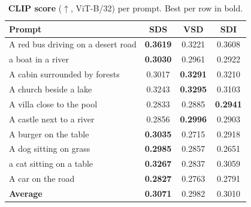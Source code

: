 \begin{table}[t]
  \centering
  \footnotesize
  \caption{\textbf{CLIP score} ($\uparrow$, ViT-B/32) per prompt. Best per row in bold.}
  \label{tab:clip}
  \begin{tabular}{@{}lccc@{}}
    \toprule
    Prompt & SDS & VSD & SDI \\
    \midrule
    A red bus driving on a desert road & \textbf{0.3619} & 0.3221 & 0.3608 \\
    a boat in a river                  & \textbf{0.3030} & 0.2961 & 0.2922 \\
    A cabin surrounded by forests      & 0.3017 & \textbf{0.3291} & 0.3210 \\
    A church beside a lake             & 0.3243 & \textbf{0.3295} & 0.3103 \\
    A villa close to the pool          & 0.2833 & 0.2885 & \textbf{0.2941} \\
    A castle next to a river           & 0.2856 & \textbf{0.2996} & 0.2903 \\
    A burger on the table              & \textbf{0.3035} & 0.2715 & 0.2918 \\
    A dog sitting on grass             & \textbf{0.2985} & 0.2857 & 0.2651 \\
    a cat sitting on a table           & \textbf{0.3267} & 0.2837 & 0.3059 \\
    A car on the road                  & \textbf{0.2827} & 0.2763 & 0.2791 \\
    \midrule
    \textbf{Average}                   & \textbf{0.3071} & 0.2982 & 0.3010 \\
    \bottomrule
  \end{tabular}
\end{table}
